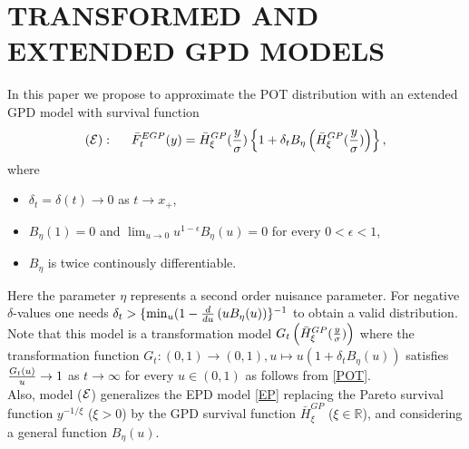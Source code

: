 \documentclass[twoside,leqno,11pt]{article}
\begin{document}
\section{TRANSFORMED AND EXTENDED GPD MODELS}
\label{Sec2}
\noindent
In this paper we propose to  approximate the POT distribution with an extended GPD model with survival function
\[
({\cal{E}}) : \hspace{0.5cm} \bar{F}^{EGP}_t(y)= \bar{H}^{GP}_\xi ({y \over \sigma})\left\{1 +\delta_t B_{\eta} \left( \bar{H}^{GP}_\xi ( {y \over \sigma}) \right) \right\}, 
\]
where 
\begin{itemize}
\item $\delta_t =\delta (t) \to 0$ as $t \to x_+$,
\item $B_{\eta} (1)=0$ and $\lim_{u \to 0} u^{1-\epsilon}B_{\eta}(u)=0$ for every $0<\epsilon <1$,
\item $B_{\eta}$ is twice continously differentiable. 
\end{itemize}
Here the parameter $\eta$ represents a second order nuisance parameter. 
For negative $\delta$-values one needs $\delta_t > \{\min_u (1-{d \over du}\, (uB_{\eta}(u))\}^{-1}$ to obtain a valid distribution. 
\\
Note that this model is a transformation model $G_t \left(\bar{H}^{GP}_\xi ({y \over \sigma}) \right)$ where 
 the transformation function $G_t: (0,1) \to (0,1), u \mapsto  u(1+\delta_t B_{\eta}(u))$ satisfies ${G_t (u) \over u} \to 1$ as $t \to \infty$ for every $u \in (0,1)$ as follows from \eqref{POT}.
 \\
 Also, model ($\cal{E}$)  generalizes the EPD model \eqref{EP} replacing the Pareto survival function $y^{-1/\xi}$ ($\xi >0$) by the GPD survival function $\bar{H}^{GP}_\xi$  ($\xi \in \mathbb{R}$), and considering a general function  $B_\eta (u)$. 
\\
  
\end{document}
